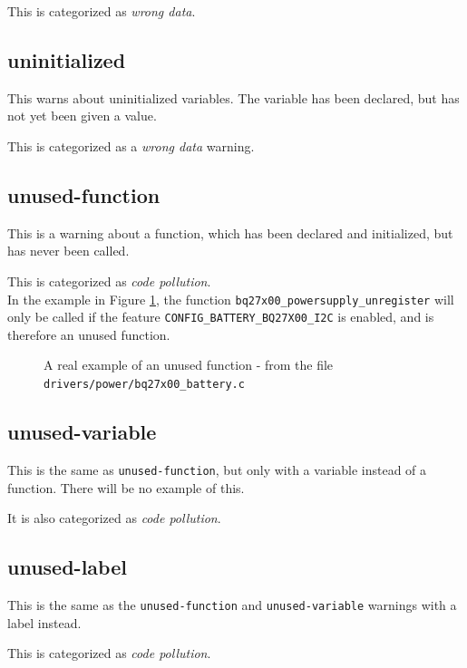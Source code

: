 \documentclass[a4paper,11pt]{report}
\newcommand{\figa}{
    \begin{figure}[!htpb]
    \centering
}
\newcommand{\figb}[2]{
    \caption{#1}
    \label{#2}
    \end{figure}
}
\begin{document}
This is categorized as \emph{wrong data}.

            \fi %

            \subsection*{uninitialized}
This warns about uninitialized variables. The variable has been declared, but 
has not yet been given a value.

This is categorized as a \emph{wrong data} warning.


            \subsection*{unused-function}
This is a warning about a function, which has been declared and initialized, 
but has never been called. 

This is categorized as \emph{code pollution}.
\\

In the example in Figure \ref{lst:unusedfuncreal}, the function 
\texttt{bq27x00\_powersupply\_unregister} will only be called if the feature 
\texttt{CONFIG\_BATTERY\_BQ27X00\_I2C} is enabled, and is therefore an 
unused function.

\figa
    
\figb{A real example of an unused function - from the file 
    \texttt{drivers/power/bq27x00\_battery.c}}{lst:unusedfuncreal}


            \subsection*{unused-variable}
This is the same as \texttt{unused-function}, but only with a variable instead 
of a function. There will be no example of this.

It is also categorized as \emph{code pollution}.


            \subsection*{unused-label}
This is the same as the \texttt{unused-function} and \texttt{unused-variable} 
warnings with a label instead.

This is categorized as \emph{code pollution}.




\newpage
\end{document}
